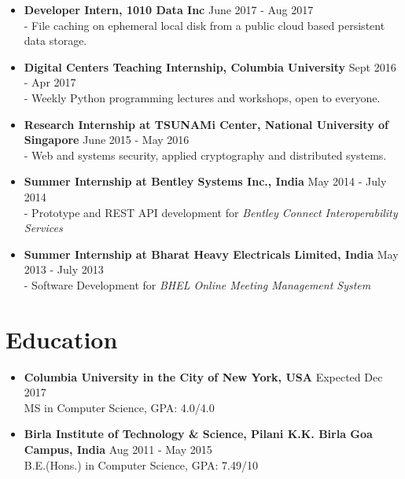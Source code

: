 \documentclass{article}
\begin{document}
\begin{itemize}
    \item \textbf{Developer Intern, 1010 Data Inc} {\hfill June 2017 - Aug 2017}\\
    - File caching on ephemeral local disk from a public cloud based persistent data storage.

    \item \textbf{Digital Centers Teaching Internship, Columbia University} {\hfill Sept 2016 - Apr 2017}\\
    - Weekly Python programming lectures and workshops, open to everyone.

    \item \textbf{Research Internship at TSUNAMi Center, National University of Singapore} {\hfill June 2015 - May 2016}\\
    - Web and systems security, applied cryptography and distributed systems.
    
    \item \textbf{Summer Internship at Bentley Systems Inc., India} {\hfill May 2014 - July 2014}\\
    - Prototype and REST API development for \textit{Bentley Connect Interoperability Services}

    \item \textbf{Summer Internship at Bharat Heavy Electricals Limited, India} {\hfill May 2013 - July 2013}\\
    - Software Development for \textit{BHEL Online Meeting Management System}
\end{itemize}

\section*{Education}
\begin{itemize}
    \item \textbf{Columbia University in the City of New York, USA} {\hfill Expected Dec 2017}\\
    MS in Computer Science, GPA: 4.0/4.0
    
    \item \textbf{Birla Institute of Technology \& Science, Pilani K.K. Birla Goa Campus, India} {\hfill Aug 2011 - May 2015}\\
    B.E.(Hons.) in Computer Science, GPA: 7.49/10

\end{itemize}
\end{document}
